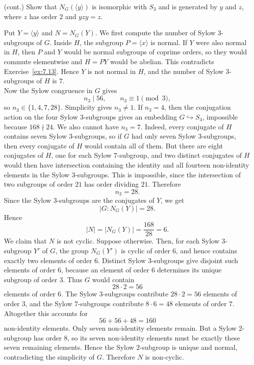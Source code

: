 \documentclass[../Odyssey_Project.tex]{subfiles}
\begin{document}
\begin{exercise}
\label{ex:7.14}
(cont.) Show that $N_G(\langle y \rangle)$ is isomorphic with $S_3$ and is generated by $y$ and $z$, where $z$ has order $2$ and $yzy = z$.
\end{exercise}
\begin{solution}
    Put $Y=\langle y\rangle$ and $N=N_G(Y)$. We first compute the number of Sylow $3$-subgroups of $G$. Inside $H$, the subgroup $P=\langle x\rangle$ is normal. If $Y$ were also normal in $H$, then $P$ and $Y$ would be normal subgroups of coprime orders, so they would commute elementwise and $H=PY$ would be abelian. This contradicts Exercise~\ref{ex:7.13}. Hence $Y$ is not normal in $H$, and the number of Sylow $3$-subgroups of $H$ is $7$.\\
    Now the Sylow congruence in $G$ gives
    \[
        n_3\mid 56,\qquad n_3\equiv 1\pmod 3,
    \]
    so $n_3\in\{1,4,7,28\}$. Simplicity gives $n_3\neq 1$. If $n_3=4$, then the conjugation action on the four Sylow $3$-subgroups gives an embedding $G\hookrightarrow S_4$, impossible because $168\nmid 24$. We also cannot have $n_3=7$. Indeed, every conjugate of $H$ contains seven Sylow $3$-subgroups, so if $G$ had only seven Sylow $3$-subgroups, then every conjugate of $H$ would contain all of them. But there are eight conjugates of $H$, one for each Sylow $7$-subgroup, and two distinct conjugates of $H$ would then have intersection containing the identity and all fourteen non-identity elements in the Sylow $3$-subgroups. This is impossible, since the intersection of two subgroups of order $21$ has order dividing $21$. Therefore
    \[
        n_3=28.
    \]
    Since the Sylow $3$-subgroups are the conjugates of $Y$, we get
    \[
        |G:N_G(Y)|=28.
    \]
    Hence
    \[
        |N|=|N_G(Y)|=\frac{168}{28}=6.
    \]
    We claim that $N$ is not cyclic. Suppose otherwise. Then, for each Sylow $3$-subgroup $Y'$ of $G$, the group $N_G(Y')$ is cyclic of order $6$, and hence contains exactly two elements of order $6$. Distinct Sylow $3$-subgroups give disjoint such elements of order $6$, because an element of order $6$ determines its unique subgroup of order $3$. Thus $G$ would contain
    \[
        28\cdot 2=56
    \]
    elements of order $6$. The Sylow $3$-subgroups contribute $28\cdot 2=56$ elements of order $3$, and the Sylow $7$-subgroups contribute $8\cdot 6=48$ elements of order $7$. Altogether this accounts for
    \[
        56+56+48=160
    \]
    non-identity elements. Only seven non-identity elements remain. But a Sylow $2$-subgroup has order $8$, so its seven non-identity elements must be exactly these seven remaining elements. Hence the Sylow $2$-subgroup is unique and normal, contradicting the simplicity of $G$. Therefore $N$ is non-cyclic.\\

\end{solution}
\end{document}
